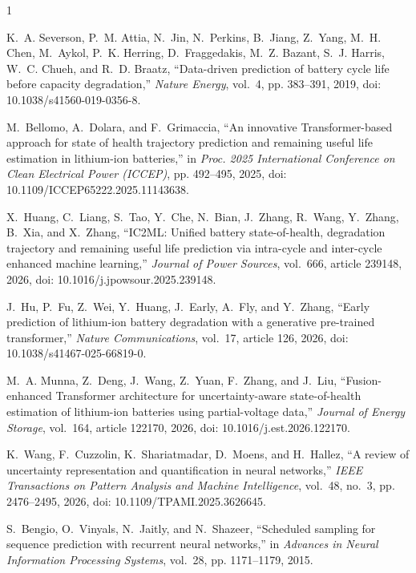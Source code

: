 \documentclass[conference]{IEEEtran}
\begin{document}

\begin{thebibliography}{1}

K.~A. Severson, P.~M. Attia, N.~Jin, N.~Perkins, B.~Jiang, Z.~Yang,
M.~H. Chen, M.~Aykol, P.~K. Herring, D.~Fraggedakis, M.~Z. Bazant,
S.~J. Harris, W.~C. Chueh, and R.~D. Braatz, ``Data-driven prediction of
battery cycle life before capacity degradation,'' \emph{Nature Energy},
vol.~4, pp. 383--391, 2019, doi: 10.1038/s41560-019-0356-8.

M.~Bellomo, A.~Dolara, and F.~Grimaccia, ``An innovative Transformer-based
approach for state of health trajectory prediction and remaining useful life
estimation in lithium-ion batteries,'' in \emph{Proc. 2025 International
Conference on Clean Electrical Power (ICCEP)}, pp. 492--495, 2025,
doi: 10.1109/ICCEP65222.2025.11143638.

X.~Huang, C.~Liang, S.~Tao, Y.~Che, N.~Bian, J.~Zhang, R.~Wang, Y.~Zhang,
B.~Xia, and X.~Zhang, ``IC2ML: Unified battery state-of-health, degradation
trajectory and remaining useful life prediction via intra-cycle and inter-cycle
enhanced machine learning,'' \emph{Journal of Power Sources}, vol.~666,
article 239148, 2026, doi: 10.1016/j.jpowsour.2025.239148.

J.~Hu, P.~Fu, Z.~Wei, Y.~Huang, J.~Early, A.~Fly, and Y.~Zhang, ``Early
prediction of lithium-ion battery degradation with a generative pre-trained
transformer,'' \emph{Nature Communications}, vol.~17, article 126, 2026,
doi: 10.1038/s41467-025-66819-0.

M.~A. Munna, Z.~Deng, J.~Wang, Z.~Yuan, F.~Zhang, and J.~Liu,
``Fusion-enhanced Transformer architecture for uncertainty-aware
state-of-health estimation of lithium-ion batteries using partial-voltage
data,'' \emph{Journal of Energy Storage}, vol.~164, article 122170, 2026,
doi: 10.1016/j.est.2026.122170.

K.~Wang, F.~Cuzzolin, K.~Shariatmadar, D.~Moens, and H.~Hallez,
``A review of uncertainty representation and quantification in neural
networks,'' \emph{IEEE Transactions on Pattern Analysis and Machine
Intelligence}, vol.~48, no.~3, pp. 2476--2495, 2026,
doi: 10.1109/TPAMI.2025.3626645.

S.~Bengio, O.~Vinyals, N.~Jaitly, and N.~Shazeer, ``Scheduled sampling for
sequence prediction with recurrent neural networks,'' in \emph{Advances in
Neural Information Processing Systems}, vol.~28, pp. 1171--1179, 2015.


\end{thebibliography}
\end{document}
